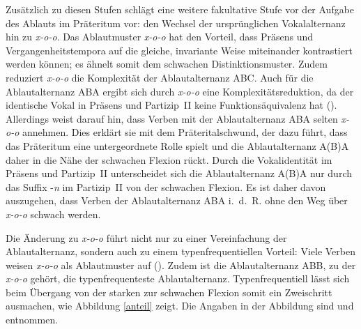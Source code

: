 Zusätzlich zu diesen Stufen schlägt \textcite[182--183]{Nowak.2013} eine weitere fakultative Stufe vor der Aufgabe des Ablauts im Präteritum vor: den Wechsel der ursprünglichen Vokalalternanz hin zu \textit{x-o-o}. Das Ablautmuster \textit{x-o-o} hat den Vorteil, dass Präsens und Vergangenheitstempora auf die gleiche, invariante Weise miteinander kontrastiert werden können; es ähnelt somit dem schwachen Distinktionsmuster. Zudem reduziert \textit{x-o-o} die Komplexität der Ablautalternanz ABC. Auch für die Ablautalternanz ABA ergibt sich durch \textit{x-o-o} eine Komplexitätsreduktion, da der identische Vokal in Präsens und Partizip~II keine Funk\-tionsäquivalenz hat (\cite[178--179]{Nowak.2013}). Allerdings weist \textcite[141]{Nowak.2016} darauf hin, dass Verben mit der Ablautalternanz ABA selten \textit{x-o-o} annehmen. Dies erklärt sie mit dem Präteritalschwund, der dazu führt, dass das Präteritum eine untergeordnete Rolle spielt und die Ablautalternanz A(B)A daher in die Nähe der schwachen Flexion rückt. Durch die Vokalidentität im Präsens und Partizip~II unterscheidet sich die Ablaut\-alternanz A(B)A nur durch das Suffix -\textit{n} im Partizip~II von der schwachen Flexion. Es ist daher davon auszugehen, dass Verben der Ablautalternanz ABA i.~d.~R. ohne den Weg über \textit{x-o-o} schwach werden. 



Die Änderung zu \textit{x-o-o} führt nicht nur zu einer Vereinfachung der Ablautalternanz, sondern auch zu einem typenfrequentiellen Vorteil: Viele Verben weisen \textit{x-o-o} als Ablautmuster auf (\cite[180--181]{Nowak.2013}). Zudem ist die Ablautalternanz ABB, zu der \textit{x-o-o} gehört, die typenfrequenteste Ablautalternanz. Typenfrequentiell lässt sich beim Übergang von der starken zur schwachen Flexion somit ein Zweischritt ausmachen, wie Abbildung \ref{anteil} zeigt. Die Angaben in der Abbildung sind \textcite[182]{Nowak.2013} und \textcite[166]{Nowak.2015} entnommen.


